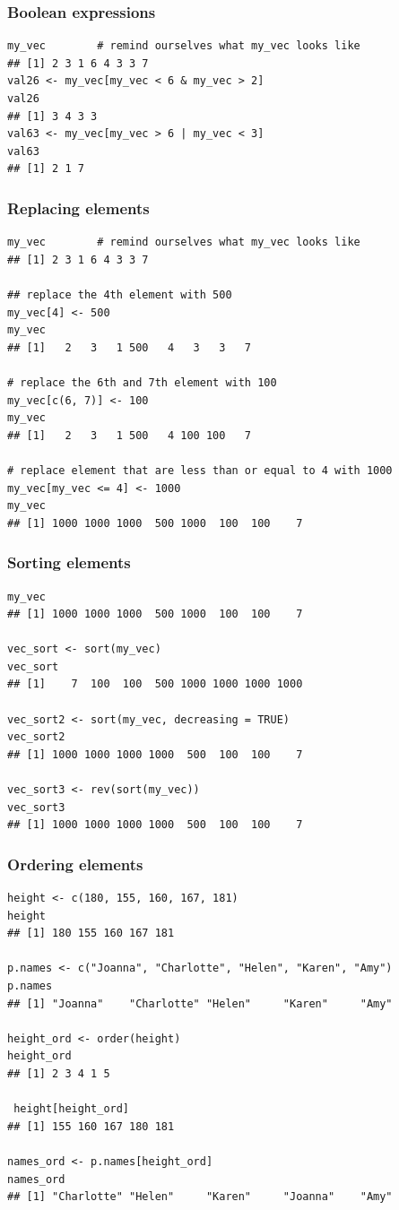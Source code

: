 \documentclass{beamer}
\newcommand{\lsting}[1]{\begin{lstlisting}[basicstyle=#1]}
\newcommand{\bfr}[1]{\begin{frame}[fragile]\frametitle{{ #1 }}}
\begin{document}
\bfr{Boolean expressions}

\begin{Verbatim}[frame=single]
my_vec        # remind ourselves what my_vec looks like
## [1] 2 3 1 6 4 3 3 7
val26 <- my_vec[my_vec < 6 & my_vec > 2]
val26
## [1] 3 4 3 3
val63 <- my_vec[my_vec > 6 | my_vec < 3]
val63
## [1] 2 1 7
\end{Verbatim}
\end{frame}


\bfr{Replacing elements}

\lsting{\scriptsize}
my_vec        # remind ourselves what my_vec looks like
## [1] 2 3 1 6 4 3 3 7

## replace the 4th element with 500
my_vec[4] <- 500
my_vec
## [1]   2   3   1 500   4   3   3   7

# replace the 6th and 7th element with 100
my_vec[c(6, 7)] <- 100
my_vec
## [1]   2   3   1 500   4 100 100   7

# replace element that are less than or equal to 4 with 1000
my_vec[my_vec <= 4] <- 1000
my_vec
## [1] 1000 1000 1000  500 1000  100  100    7
\end{lstlisting}
\end{frame}

\bfr{Sorting elements}

\lsting{\scriptsize}
my_vec
## [1] 1000 1000 1000  500 1000  100  100    7

vec_sort <- sort(my_vec)
vec_sort
## [1]    7  100  100  500 1000 1000 1000 1000

vec_sort2 <- sort(my_vec, decreasing = TRUE)
vec_sort2
## [1] 1000 1000 1000 1000  500  100  100    7

vec_sort3 <- rev(sort(my_vec))
vec_sort3
## [1] 1000 1000 1000 1000  500  100  100    7
\end{lstlisting}
\end{frame}

\bfr{Ordering elements}

\lsting{\scriptsize}
height <- c(180, 155, 160, 167, 181)
height
## [1] 180 155 160 167 181

p.names <- c("Joanna", "Charlotte", "Helen", "Karen", "Amy")
p.names
## [1] "Joanna"    "Charlotte" "Helen"     "Karen"     "Amy"

height_ord <- order(height)
height_ord
## [1] 2 3 4 1 5

 height[height_ord]
## [1] 155 160 167 180 181

names_ord <- p.names[height_ord]
names_ord
## [1] "Charlotte" "Helen"     "Karen"     "Joanna"    "Amy"
\end{lstlisting}
\end{frame}
\end{document}
